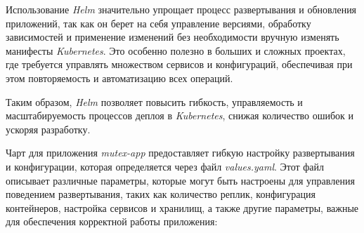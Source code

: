 Использование \textit{Helm} значительно упрощает процесс развертывания и обновления приложений, так как он берет на себя управление версиями, обработку зависимостей и применение изменений без необходимости вручную изменять манифесты \textit{Kubernetes}. Это особенно полезно в больших и сложных проектах, где требуется управлять множеством сервисов и конфигураций, обеспечивая при этом повторяемость и автоматизацию всех операций.

Таким образом, \textit{Helm} позволяет повысить гибкость, управляемость и масштабируемость процессов деплоя в \textit{Kubernetes}, снижая количество ошибок и ускоряя разработку.

Чарт для приложения \textit{mutex-app} предоставляет гибкую настройку развертывания и конфигурации, которая определяется через файл \textit{values.yaml}. Этот файл описывает различные параметры, которые могут быть настроены для управления поведением развертывания, таких как количество реплик, конфигурация контейнеров, настройка сервисов и хранилищ, а также другие параметры, важные для обеспечения корректной работы приложения:

